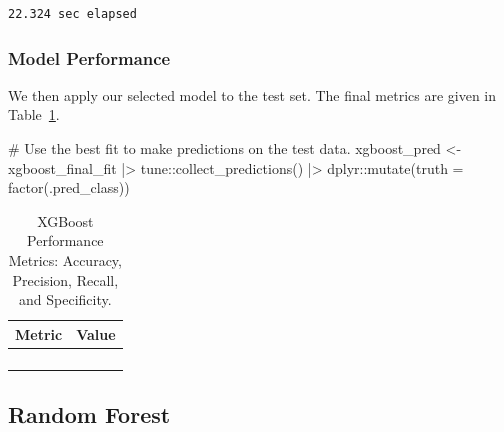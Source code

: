 \documentclass[
  letterpaper,
  DIV=11,
  numbers=noendperiod]{scrartcl}
\newenvironment{Shaded}{\begin{snugshade}}{\end{snugshade}}
\newcommand{\AttributeTok}[1]{\textcolor[rgb]{0.40,0.45,0.13}{#1}}
\newcommand{\CommentTok}[1]{\textcolor[rgb]{0.37,0.37,0.37}{#1}}
\newcommand{\FunctionTok}[1]{\textcolor[rgb]{0.28,0.35,0.67}{#1}}
\newcommand{\NormalTok}[1]{\textcolor[rgb]{0.00,0.23,0.31}{#1}}
\newcommand{\OtherTok}[1]{\textcolor[rgb]{0.00,0.23,0.31}{#1}}
\newcommand{\SpecialCharTok}[1]{\textcolor[rgb]{0.37,0.37,0.37}{#1}}
\begin{document}
\begin{verbatim}
22.324 sec elapsed
\end{verbatim}

\subsubsection{Model Performance}\label{model-performance-4}

We then apply our selected model to the test set. The final metrics are
given in Table~\ref{tbl-xgboost-performance}.

\begin{Shaded}
\begin{Highlighting}[]
\CommentTok{\# Use the best fit to make predictions on the test data.}
\NormalTok{xgboost\_pred }\OtherTok{\textless{}{-}} 
\NormalTok{  xgboost\_final\_fit }\SpecialCharTok{|\textgreater{}} 
\NormalTok{  tune}\SpecialCharTok{::}\FunctionTok{collect\_predictions}\NormalTok{() }\SpecialCharTok{|\textgreater{}}
\NormalTok{  dplyr}\SpecialCharTok{::}\FunctionTok{mutate}\NormalTok{(}\AttributeTok{truth =} \FunctionTok{factor}\NormalTok{(.pred\_class))}
\end{Highlighting}
\end{Shaded}

\begin{longtable}{>{\raggedright\arraybackslash}p{}>{\raggedleft\arraybackslash}p{}}

\caption{\label{tbl-xgboost-performance}XGBoost Performance Metrics:
Accuracy, Precision, Recall, and Specificity.}


\tabularnewline

\toprule
Metric & Value \\ 
\midrule\addlinespace[2.5pt]
\cellcolor[HTML]{FFFFFF}{Accuracy} & \cellcolor[HTML]{FFFFFF}{91.2} \\ 
\cellcolor[HTML]{FFFFFF}{Precision} & \cellcolor[HTML]{FFFFFF}{73.1} \\ 
\cellcolor[HTML]{FFFFFF}{Recall} & \cellcolor[HTML]{FFFFFF}{95.0} \\ 
\cellcolor[HTML]{FFFFFF}{Specificity} & \cellcolor[HTML]{FFFFFF}{90.1} \\ 
\bottomrule

\end{longtable}

\subsection{Random Forest}\label{random-forest}
\end{document}
